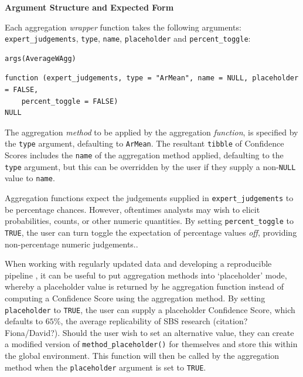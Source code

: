 \documentclass[article]{jss}
\begin{document}
\begin{tcolorbox}[enhanced jigsaw, breakable, opacityback=0, left=2mm, toprule=.15mm, rightrule=.15mm, bottomrule=.15mm, colframe=quarto-callout-color-frame, arc=.35mm, leftrule=.75mm, colback=white]
\textbf{Argument Structure and Expected Form}

Each aggregation \emph{wrapper} function takes the following arguments:
\texttt{expert\_judgements}, \texttt{type}, \texttt{name},
\texttt{placeholder} and \texttt{percent\_toggle}:

\begin{verbatim}
args(AverageWAgg)
\end{verbatim}

\begin{verbatim}
function (expert_judgements, type = "ArMean", name = NULL, placeholder = FALSE, 
    percent_toggle = FALSE) 
NULL
\end{verbatim}

The aggregation \emph{method} to be applied by the aggregation
\emph{function}, is specified by the \texttt{type} argument, defaulting
to \texttt{ArMean}. The resultant \texttt{tibble} of Confidence Scores
includes the \texttt{name} of the aggregation method applied, defaulting
to the \texttt{type} argument, but this can be overridden by the user if
they supply a non-\texttt{NULL} value to \texttt{name}.

Aggregation functions expect the judgements supplied in
\texttt{expert\_judgements} to be percentage chances. However,
oftentimes analysts may wish to elicit probabilities, counts, or other
numeric quantities. By setting \texttt{percent\_toggle} to
\texttt{TRUE}, the user can turn toggle the expectation of percentage
values \emph{off}, providing non-percentage numeric judgements..

When working with regularly updated data and developing a reproducible
pipeline \citep{Yenni2019} , it can be useful to put aggregation methods
into `placeholder' mode, whereby a placeholder value is returned by he
aggregation function instead of computing a Confidence Score using the
aggregation method. By setting \texttt{placeholder} to \texttt{TRUE},
the user can supply a placeholder Confidence Score, which defaults to
\(65\%\), the average replicability of SBS research (citation?
Fiona/David?). Should the user wish to set an alternative value, they
can create a modified version of \texttt{method\_placeholder()} for
themselves and store this within the global environment. This function
will then be called by the aggregation method when the
\texttt{placeholder} argument is set to \texttt{TRUE}.


\end{tcolorbox}
\end{document}

